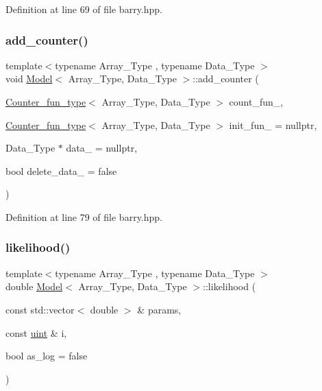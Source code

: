 Definition at line 69 of file barry.\+hpp.

\mbox{\label{classbarry_1_1_model_a950b0429e07047d4774eac60f7c335f2}} 
\subsubsection{\texorpdfstring{add\+\_\+counter()}{add\_counter()}\hspace{0.1cm}{\footnotesize\ttfamily [3/3]}}
{\footnotesize\ttfamily template$<$typename Array\+\_\+\+Type , typename Data\+\_\+\+Type $>$ \\
void \hyperlink{classbarry_1_1_model}{Model}$<$ Array\+\_\+\+Type, Data\+\_\+\+Type $>$\+::add\+\_\+counter (\begin{DoxyParamCaption}\item[{\hyperlink{namespacebarry_abaaae3200da8e4b7faac3c04fe9c3081}{Counter\+\_\+fun\+\_\+type}$<$ Array\+\_\+\+Type, Data\+\_\+\+Type $>$}]{count\+\_\+fun\+\_\+,  }\item[{\hyperlink{namespacebarry_abaaae3200da8e4b7faac3c04fe9c3081}{Counter\+\_\+fun\+\_\+type}$<$ Array\+\_\+\+Type, Data\+\_\+\+Type $>$}]{init\+\_\+fun\+\_\+ = {\ttfamily nullptr},  }\item[{Data\+\_\+\+Type $\ast$}]{data\+\_\+ = {\ttfamily nullptr},  }\item[{bool}]{delete\+\_\+data\+\_\+ = {\ttfamily false} }\end{DoxyParamCaption})\hspace{0.3cm}{\ttfamily [inline]}}



Definition at line 79 of file barry.\+hpp.

\mbox{\label{classbarry_1_1_model_abc2f255c6b6c4dd0ff3680aab35fd308}} 
\subsubsection{\texorpdfstring{likelihood()}{likelihood()}\hspace{0.1cm}{\footnotesize\ttfamily [1/2]}}
{\footnotesize\ttfamily template$<$typename Array\+\_\+\+Type , typename Data\+\_\+\+Type $>$ \\
double \hyperlink{classbarry_1_1_model}{Model}$<$ Array\+\_\+\+Type, Data\+\_\+\+Type $>$\+::likelihood (\begin{DoxyParamCaption}\item[{const std\+::vector$<$ double $>$ \&}]{params,  }\item[{const \hyperlink{namespacebarry_a11dfc53ddb4672278319aa04f1e09a6c}{uint} \&}]{i,  }\item[{bool}]{as\+\_\+log = {\ttfamily false} }\end{DoxyParamCaption})\hspace{0.3cm}{\ttfamily [inline]}}



